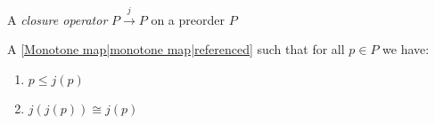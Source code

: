 

A \emph{closure operator} $P \xrightarrow{j} P$ on a preorder $P$

A \ref{Monotone map|monotone map|referenced} such that for all $p \in P$ we have:
\begin{enumerate}
  \item $p \leq j(p)$
  \item $j(j(p)) \cong j(p)$
\end{enumerate}
